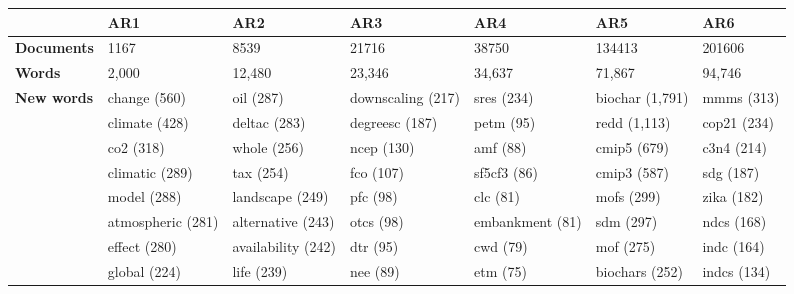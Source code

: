 \begin{tabular}{l p{2.8cm} p{2.8cm} p{2.8cm} p{2.8cm} p{2.8cm} p{2.8cm}} 
&\textbf{AR1} & \textbf{AR2} & \textbf{AR3} & \textbf{AR4} & \textbf{AR5} & \textbf{AR6}\\ \hline\textbf{Documents} &1167 & 8539 & 21716 & 38750 & 134413 & 201606\\ 
\textbf{Words} &2,000 & 12,480 & 23,346 & 34,637 & 71,867 & 94,746\\ 
\textbf{New words} & change (560) & oil (287) & downscaling (217) & sres (234) & biochar (1,791) & mmms (313)\\ & climate (428) & deltac (283) & degreesc (187) & petm (95) & redd (1,113) & cop21 (234)\\ & co2 (318) & whole (256) & ncep (130) & amf (88) & cmip5 (679) & c3n4 (214)\\ & climatic (289) & tax (254) & fco (107) & sf5cf3 (86) & cmip3 (587) & sdg (187)\\ & model (288) & landscape (249) & pfc (98) & clc (81) & mofs (299) & zika (182)\\ & atmospheric (281) & alternative (243) & otcs (98) & embankment (81) & sdm (297) & ndcs (168)\\ & effect (280) & availability (242) & dtr (95) & cwd (79) & mof (275) & indc (164)\\ & global (224) & life (239) & nee (89) & etm (75) & biochars (252) & indcs (134)
\end{tabular}